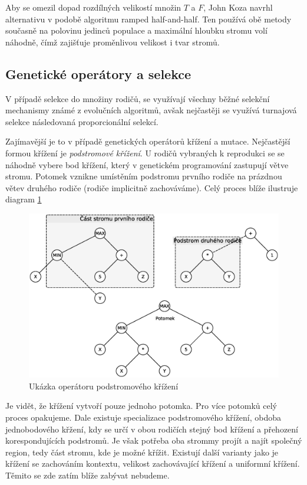 Aby se omezil dopad rozdílných velikostí množin $T$ a $F$, John Koza navrhl alternativu
v podobě algoritmu ramped half-and-half. Ten používá obě metody současně na polovinu 
jedinců populace a maximální hloubku stromu volí náhodně, čímž zajišťuje proměnlivou
velikost i tvar stromů.

\subsection{Genetické operátory a selekce}

V případě selekce do množiny rodičů, se využívají všechny běžné selekční mechanismy
známé z evolučních algoritmů, avšak nejčastěji se využívá turnajová selekce následovaná
proporcionální selekcí.

Zajímavější je to v případě genetických operátorů křížení a mutace. Nejčastější formou
křížení je \textit{podstromové křížení}. U rodičů vybraných k reprodukci se se náhodně 
vybere bod křížení, který v genetickém programování zastupují větve stromu. Potomek
vznikne umístěním podstromu prvního rodiče na prázdnou větev druhého rodiče (rodiče
implicitně zachováváme). Celý proces blíže ilustruje diagram \ref{fig:tree_crossover}

\begin{figure}[!ht]
	\centering
	\includegraphics[scale=0.6]{fig/tree_crossover}	
	\caption{Ukázka operátoru podstromového křížení}
	\label{fig:tree_crossover}
\end{figure}

Je vidět, že křížení vytvoří pouze jednoho potomka. Pro více potomků celý proces 
opakujeme. Dale existuje specializace podstromového křížení, obdoba jednobodového
křžení, kdy se určí v obou rodičích stejný bod křížení a přehození korespondujících
podstromů. Je však potřeba oba strommy projít a najít společný region, tedy část stromu,
kde je možné křížit. Existují další varianty jako je křížení se zachováním kontextu, 
velikost zachovávající křížení a uniformní křížení. Těmito se zde zatím blíže zabývat
nebudeme.


